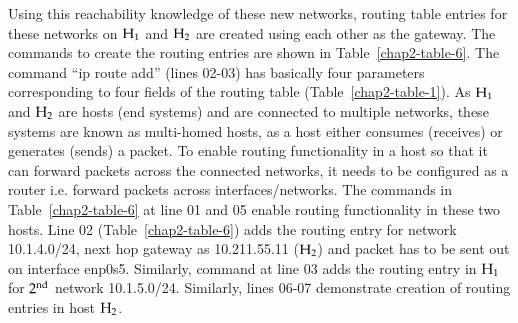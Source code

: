 \begin{multicols}{2}
Using this reachability knowledge of these new networks, routing table entries for these networks on ${\rm H}_{1}$ and ${\rm H}_{2}$ are created using each other as the gateway. The commands to create the routing entries are shown in Table~\ref{chap2-table-6}. The command “ip route add” (lines 02-03) has basically four parameters corresponding to four fields of the routing table (Table~\ref{chap2-table-1}). As ${\rm H}_{1}$ and ${\rm H}_{2}$ are hosts (end systems) and are connected to multiple networks, these systems are known as multi-homed hosts, as a host either consumes (receives) or generates (sends) a packet. To enable routing functionality in a host so that it can forward packets across the connected networks, it needs to be configured as a router i.e. forward packets across interfaces/networks. The commands in Table~\ref{chap2-table-6} at line 01 and 05 enable routing functionality in these two hosts. Line 02 (Table~\ref{chap2-table-6}) adds the routing entry for network 10.1.4.0/24, next hop gateway as 10.211.55.11 (${\rm H}_{2}$) and packet has to be sent out on interface enp0s5. Similarly, command at line 03 adds the routing entry in ${\rm H}_{1}$ for $2^{\rm nd}$ network 10.1.5.0/24. Similarly, lines 06-07 demonstrate creation of routing entries in host ${\rm H}_{2}$.
\end{multicols}

\vspace{-1cm}

